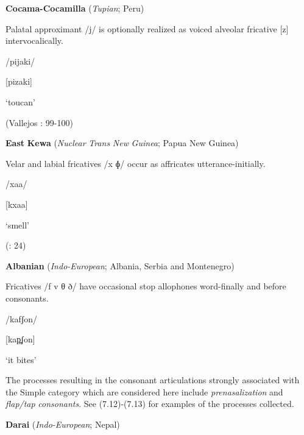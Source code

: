 \ea\label{ex:(7.9)}
  \textbf{Cocama-Cocamilla} (\textit{Tupian}; Peru)



Palatal approximant /j/ is optionally realized as voiced alveolar fricative [z] intervocalically.



/pijaki/



[pizaki]



‘toucan’



(Vallejos \citealt{Yopán2010}: 99-100)
\z



\ea\label{ex:(7.10)}
  \textbf{East} \textbf{Kewa} (\textit{Nuclear} \textit{Trans} \textit{New} \textit{Guinea}; Papua New Guinea)



Velar and labial fricatives /x ɸ/ occur as affricates utterance-initially.



/xaa/



[kxaa]



‘smell’



(\citealt{FranklinFranklin1978}: 24)
\z



\ea\label{ex:(7.11)}
  \textbf{Albanian} (\textit{Indo-European}; Albania, Serbia and Montenegro)



Fricatives /f v θ ð/ have occasional stop allophones word-finally and before consonants.



/kafʃon/



[kap̪ʃon]



‘it bites’



\citep[16]{Newmark1957}

\z


  The processes resulting in the consonant articulations strongly associated with the Simple category which are considered here include \textit{prenasalization} and \textit{flap/tap} \textit{consonants}. See (7.12)-(7.13) for examples of the processes collected.



\ea\label{ex:(7.12)}
  \textbf{Darai} (\textit{Indo-European}; Nepal)



